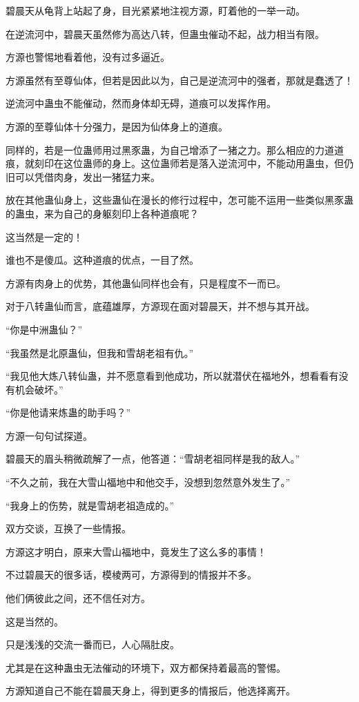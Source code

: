 \begin{this_body}
碧晨天从龟背上站起了身，目光紧紧地注视方源，盯着他的一举一动。

在逆流河中，碧晨天虽然修为高达八转，但蛊虫催动不起，战力相当有限。

方源也警惕地看着他，没有过多逼近。

方源虽然有至尊仙体，但若是因此以为，自己是逆流河中的强者，那就是蠢透了！

逆流河中蛊虫不能催动，然而身体却无碍，道痕可以发挥作用。

方源的至尊仙体十分强力，是因为仙体身上的道痕。

同样的，若是一位蛊师用过黑豕蛊，为自己增添了一猪之力。那么相应的力道道痕，就刻印在这位蛊师的身上。这位蛊师若是落入逆流河中，不能动用蛊虫，但仍旧可以凭借肉身，发出一猪猛力来。

放在其他蛊仙身上，这些蛊仙在漫长的修行过程中，怎可能不运用一些类似黑豕蛊的蛊虫，来为自己的身躯刻印上各种道痕呢？

这当然是一定的！

谁也不是傻瓜。这种道痕的优点，一目了然。

方源有肉身上的优势，其他蛊仙同样也会有，只是程度不一而已。

对于八转蛊仙而言，底蕴雄厚，方源现在面对碧晨天，并不想与其开战。

“你是中洲蛊仙？”

“我虽然是北原蛊仙，但我和雪胡老祖有仇。”

“我见他大炼八转仙蛊，并不愿意看到他成功，所以就潜伏在福地外，想看看有没有机会破坏。”

“你是他请来炼蛊的助手吗？”

方源一句句试探道。

碧晨天的眉头稍微疏解了一点，他答道：“雪胡老祖同样是我的敌人。”

“不久之前，我在大雪山福地中和他交手，没想到忽然意外发生了。”

“我身上的伤势，就是雪胡老祖造成的。”

双方交谈，互换了一些情报。

方源这才明白，原来大雪山福地中，竟发生了这么多的事情！

不过碧晨天的很多话，模棱两可，方源得到的情报并不多。

他们俩彼此之间，还不信任对方。

这是当然的。

只是浅浅的交流一番而已，人心隔肚皮。

尤其是在这种蛊虫无法催动的环境下，双方都保持着最高的警惕。

方源知道自己不能在碧晨天身上，得到更多的情报后，他选择离开。


\end{this_body}
